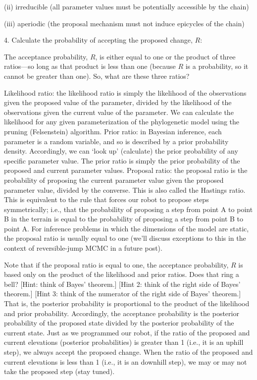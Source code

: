 \documentclass[11pt]{article}
\begin{document}
\begin{enumerate}
{(ii) irreducible (all parameter values must be potentially accessible by the chain)

(iii) aperiodic (the proposal mechanism must not induce epicycles of the chain)}

4. Calculate the probability of accepting the proposed change, $R$:

The acceptance probability, $R$, is either equal to one or the product of three ratios—so long as that product is less than one (because $R$ is a probability, so it cannot be greater than one). So, what are these three ratios?

Likelihood ratio: the likelihood ratio is simply the likelihood of the observations given the proposed value of the parameter, divided by the likelihood of the observations given the current value of the parameter. We can calculate the likelihood for any given parameterization of the phylogenetic model using the pruning (Felsenstein) algorithm.
Prior ratio: in Bayesian inference, each parameter is a random variable, and so is described by a prior probability density. Accordingly, we can `look up’ (calculate) the prior probability of any specific parameter value. The prior ratio is simply the prior probability of the proposed and current parameter values.
Proposal ratio: the proposal ratio is the probability of proposing the current parameter value given the proposed parameter value, divided by the converse. This is also called the Hastings ratio. This is equivalent to the rule that forces our robot to propose steps symmetrically; i.e., that the probability of proposing a step from point A to point B in the terrain is equal to the probability of proposing a step from point B to point A. For inference problems in which the dimensions of the model are static, the proposal ratio is usually equal to one (we’ll discuss exceptions to this in the context of reversible-jump MCMC in a future post).

Note that if the proposal ratio is equal to one, the acceptance probability, $R$ is based only on the product of the likelihood and prior ratios. Does that ring a bell? [Hint: think of Bayes' theorem.] [Hint 2: think of the right side of Bayes' theorem.] [Hint 3: think of the numerator of the right side of Bayes' theorem.] That is, the posterior probability is proportional to the product of the likelihood and prior probability. Accordingly, the acceptance probability is the posterior probability of the proposed state divided by the posterior probability of the current state. Just as we programmed our robot, if the ratio of the proposed and current elevations (posterior probabilities) is greater than 1 (i.e., it is an uphill step), we always accept the proposed change. When the ratio of the proposed and current elevations is less than 1 (i.e., it is an downhill step), we may or may not take the proposed step (stay tuned).


\end{enumerate}
\end{document}
